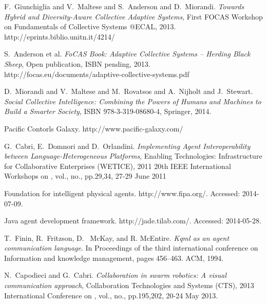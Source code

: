 \begin{thebibliography}{1}


F.~Giunchiglia and V.~Maltese and S.~Anderson and D.~Miorandi. \emph{Towards Hybrid and Diversity-Aware Collective Adaptive Systems}, First FOCAS Workshop on Fundamentals of Collective Systems @ECAL, 2013. http://eprints.biblio.unitn.it/4214/

S.~Anderson et al. \emph{FoCAS Book: Adaptive Collective Systems – Herding Black Sheep}, Open publication, ISBN pending, 2013. http://focas.eu/documents/adaptive-collective-systems.pdf

D.~Miorandi and V.~Maltese and M.~Rovatsos and A.~Nijholt and J.~Stewart. \emph{Social Collective Intelligence: Combining the Powers of Humans and Machines to Build a Smarter Society}, ISBN 978-3-319-08680-4, Springer, 2014.


Pacific Contorls Galaxy. http://www.pacific-galaxy.com/



G.~Cabri, E.~Domnori and D.~Orlandini. \emph{Implementing Agent Interoperability between Language-Heterogeneous Platforms}, Enabling Technologies: Infrastructure for Collaborative Enterprises (WETICE), 2011 20th IEEE International Workshops on , vol., no., pp.29,34, 27-29 June 2011

Foundation for intelligent physical agents. http://www.fipa.org/. Accessed: 2014-07-09.

Java agent development framework. http://jade.tilab.com/. Accessed: 2014-05-28.

T.~Finin, R.~Fritzson, D.~ McKay, and R. McEntire. \emph{Kqml as an agent communication language}. In Proceedings of the third international conference on Information and knowledge management, pages 456–463. ACM, 1994.

N.~Capodieci and G.~Cabri. \emph{Collaboration in swarm robotics: A visual communication approach}, Collaboration Technologies and Systems (CTS), 2013 International Conference on , vol., no., pp.195,202, 20-24 May 2013.


\end{thebibliography}
